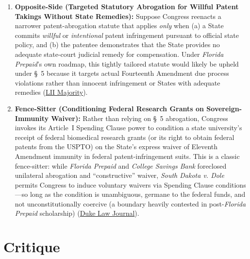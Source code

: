 \documentclass[12pt]{article}
\begin{document}
\begin{enumerate}
\item \textbf{Opposite-Side (Targeted Statutory Abrogation for Willful Patent Takings Without State Remedies):} Suppose Congress reenacts a narrower patent-abrogation statute that applies \textit{only} when (a) a State commits \textit{willful} or \textit{intentional} patent infringement pursuant to official state policy, and (b) the patentee demonstrates that the State provides no adequate state-court judicial remedy for compensation. Under \textit{Florida Prepaid}'s own roadmap, this tightly tailored statute would likely be upheld under \S~5 because it targets actual Fourteenth Amendment due process violations rather than innocent infringement or States with adequate remedies (\href{https://www.law.cornell.edu/supct/html/98-531.ZO.html}{LII Majority}).

\item \textbf{Fence-Sitter (Conditioning Federal Research Grants on Sovereign-Immunity Waiver):} Rather than relying on \S~5 abrogation, Congress invokes its Article~I Spending Clause power to condition a state university's receipt of federal biomedical research grants (or its right to obtain federal patents from the USPTO) on the State's express waiver of Eleventh Amendment immunity in federal patent-infringement suits. This is a classic fence-sitter: while \textit{Florida Prepaid} and \textit{College Savings Bank} foreclosed unilateral abrogation and ``constructive'' waiver, \textit{South Dakota v. Dole} permits Congress to induce voluntary waivers via Spending Clause conditions---so long as the condition is unambiguous, germane to the federal funds, and not unconstitutionally coercive (a boundary heavily contested in post-\textit{Florida Prepaid} scholarship) (\href{https://scholarship.law.duke.edu/cgi/viewcontent.cgi?article=1142&context=dlj}{Duke Law Journal}).
\end{enumerate}

\section{Critique}
\end{document}
